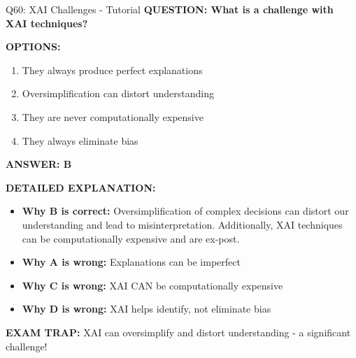\documentclass[8pt]{beamer}
\begin{document}
	\begin{frame}{Q60: XAI Challenges - Tutorial}
		\fontsize{6.5}{7.5}\selectfont
		\textbf{QUESTION: What is a challenge with XAI techniques?}
		
		\vspace{0.1cm}
		\textbf{OPTIONS:}
		\begin{enumerate}
			\item They always produce perfect explanations
			\item Oversimplification can distort understanding
			\item They are never computationally expensive
			\item They always eliminate bias
		\end{enumerate}
		
		\vspace{0.1cm}
		\textcolor{myblue}{\textbf{ANSWER: B}}
		
		\vspace{0.1cm}
		\textbf{DETAILED EXPLANATION:}
		\begin{itemize}
			\item \textbf{Why B is correct:} Oversimplification of complex decisions can distort our understanding and lead to misinterpretation. Additionally, XAI techniques can be computationally expensive and are ex-post.
			\item \textbf{Why A is wrong:} Explanations can be imperfect
			\item \textbf{Why C is wrong:} XAI CAN be computationally expensive
			\item \textbf{Why D is wrong:} XAI helps identify, not eliminate bias
		\end{itemize}
		
		\textcolor{myred}{\textbf{EXAM TRAP:}} XAI can \textcolor{myblue}{oversimplify and distort understanding} - a significant challenge!
	\end{frame}
	
\end{document}
